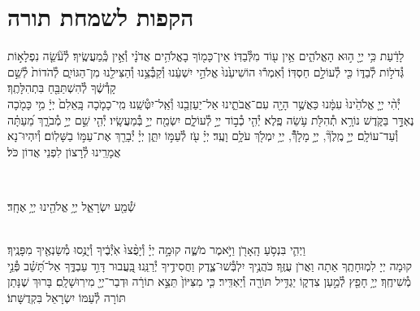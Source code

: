 \documentclass[twoside, openany, parskip=half, 11pt]{book}
\begin{document}
\chapter[הקפות לשמחת תורה]{ הקפות לשמחת תורה }


לָדַ֔עַת כִּ֥י יְיָ֖ ה֣וּא הָאֱלֹהִ֑ים אֵ֥ין ע֖וֹד מִלְּ֯בַדּֽוֹ׃ \hfill \break
אֵין־כָּמ֖וֹךָ בָאֱלֹהִ֥ים אֲדֹנָ֗י וְ֯אֵ֣ין כְּֽ֯מַעֲשֶֽׂיךָ׃ \hfill \break
לְ֯עֹ֘שֵׂ֤ה נִפְלָא֣וֹת גְּ֯דֹל֣וֹת לְ֯בַדּ֑וֹ כִּ֖י לְ֯עוֹלָ֣ם חַסְדּֽוֹ׃ \hfill \break
וְ֯אִמְר֕וּ הוֹשִׁיעֵ֙נוּ֙ אֱלֹהֵ֣י יִשְׁעֵ֔נוּ וְ֯קַבְּ֯צֵ֥נוּ וְ֯הַצִּילֵ֖נוּ מִן־הַגּוֹיִ֑ם לְ֯הֹדוֹת֙ לְ֯שֵׁ֣ם קָדְ֯שֶׁ֔ךָ לְ֯הִשְׁתַּבֵּ֖חַ בִּתְהִלָּתֶֽךָ׃\\
יְ֯הִ֨י יְיָ֤ אֱלֹהֵ֙ינוּ֙ עִמָּ֔נוּ כַּאֲשֶׁ֥ר הָיָ֖ה עִם־אֲבֹתֵ֑ינוּ אַל־יַעַזְבֵ֖נוּ וְ֯אַֽל־יִטְּ֯שֵֽׁנוּ׃ \hfill \break
מִֽי־כָמֹ֤כָה בָּֽאֵלִם֙ יְיָ֔ מִ֥י כָּמֹ֖כָה נֶאְדָּ֣ר בַּקֹּ֑דֶשׁ נוֹרָ֥א תְ֯הִלֹּ֖ת עֹ֥שֵׂה פֶֽלֶא׃ \hfill \break
יְ֯הִ֤י כְ֯ב֣וֹד יְיָ֣ לְ֯עוֹלָ֑ם יִשְׂמַ֖ח יְיָ֣ בְּ֯מַעֲשָֽׂיו׃ \hfill \break
יְ֯הִ֤י שֵׁ֣ם יְיָ֣ מְ֯בֹרָ֑ךְ מֵ֝עַתָּ֗ה וְ֯עַד־עוֹלָֽם׃ \hfill \break
יְיָ֣ מֶֽלֶךְ֘, יְיָ֣ מָלָךְ֯֘, יְיָ֥ יִמְלֹ֖ךְ עֹלָ֥ם וָעֶֽד׃ \hfill \break
יְיָ֗ עֹ֖ז לְ֯עַמּ֣וֹ יִתֵּ֑ן יְיָ֓ יְ֯בָרֵ֖ךְ אֶת־עַמּ֣וֹ בַשָּׁלֽוֹם׃ \hfill \break
וְ֯יִהְיוּ־נָא אֲמָרֵֽינוּ לְ֯רָצוֹן לִפְנֵי אֲדוֹן כֹּל׃ \hfill \break

\vspace{-1.3\baselineskip}

\\
\begin{large}
שְׁ֯מַ֖ע יִשְׂרָאֵ֑ל יְיָ֥ אֱלֹהֵ֖ינוּ יְיָ֥ אֶחָֽד׃
\end{large}

\\
וַיְהִ֛י בִּנְסֹ֥עַ הָֽאָרֹ֖ן וַיֹּ֣אמֶר מֹשֶׁ֑ה קוּמָ֣ה יְיָ֗ וְ֯יָפֻ֨צוּ֙ אֹֽיְ֯בֶ֔יךָ וְ֯יָנֻ֥סוּ מְ֯שַׂנְאֶ֖יךָ מִפָּנֶֽיךָ׃\\
קוּמָה יְיָ לִמְוּחָתֶֽךָ אַתָה וַאֲרֹן עֻזֶּֽךָ׃ \hfill \break
כֹּהֲנֶ֥יךָ יִלְבְּ֯שׁוּ־צֶ֑דֶק וַחֲסִידֶ֥יךָ יְ֯רַנֵּֽנוּ׃ \hfill \break
בַּֽ֭עֲבוּר דָּוִ֣ד עַבְדֶּ֑ךָ אַל־תָּ֝שֵׁ֗ב פְּ֯נֵ֣י מְ֯שִׁיחֶֽךָ׃ \hfill \break
יְיָ֥ חָפֵ֖ץ לְ֯מַ֣עַן צִדְק֑וֹ יַגְדִּ֥יל תּוֹרָ֖ה וְ֯יַאְדִּֽיר׃ \hfill \break
כִּ֤י מִצִּיּוֹן֙ תֵּצֵ֣א תוֹרָ֔ה וּדְבַר־יְיָ֖ מִירֽוּשָׁלָֽםִ׃ \hfill \break
בָּרוּךְ שֶׁנָּתַן תּוֹרָה לְ֯עַמּוֹ יִשְׂרָאֵל בִּקְדֻשָּׁתוֹ׃ \hfill \break
\end{document}
